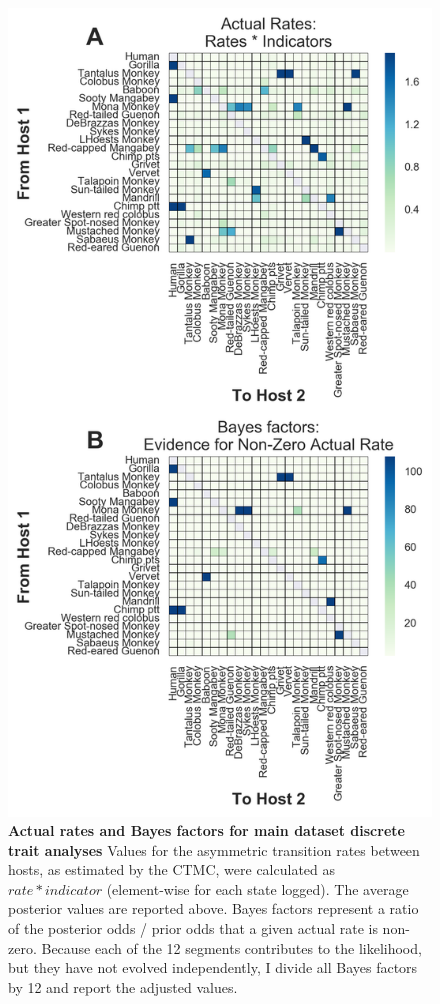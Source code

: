 \begin{figure}[h!]
  \begin{centering}
    \includegraphics[width=.6\linewidth]{./png/siv_maindata_transmissions.png}
  	\caption[Pairwise host transmission rates (`main' dataset)]{\textbf{Actual rates and Bayes factors for main dataset discrete trait analyses }
Values for the asymmetric transition rates between hosts, as estimated by the CTMC, were calculated as $rate * indicator$ (element-wise for each state logged).
The average posterior values are reported above.
Bayes factors represent a ratio of the posterior odds / prior odds that a given actual rate is non-zero.
Because each of the 12 segments contributes to the likelihood, but they have not evolved independently, I divide all Bayes factors by 12 and report the adjusted values.
        }
  	\label{siv_maindata_transmissions}
  \end{centering}
\end{figure}

